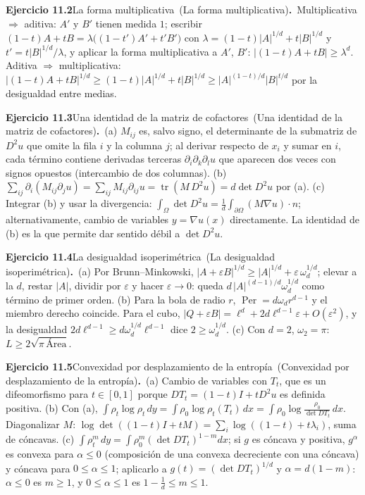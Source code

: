 \documentclass[11pt,a4paper]{amsart}
\newcommand{\ve}{\varepsilon}
\theoremstyle{remark}
\theoremstyle{definition}
\numberwithin{subsection}{section}
\numberwithin{equation}{section}
\newcommand{\ejlabel}[2]{\par\medskip\noindent\textbf{Ejercicio #1}\ifx\relax#2\relax\else\ (#2)\fi\textbf{.}\ }
\begin{document}
\ejlabel{11.2}{La forma multiplicativa}Multiplicativa $\Rightarrow$ aditiva: $A'$ y $B'$ tienen medida $1$; escribir $(1-t)A+tB=\lambda\bigl((1-t')A'+t'B'\bigr)$ con $\lambda=(1-t)|A|^{1/d}+t|B|^{1/d}$ y $t'=t|B|^{1/d}/\lambda$, y aplicar la forma multiplicativa a $A'$, $B'$: $|(1-t)A+tB|\ge\lambda^d$. Aditiva $\Rightarrow$ multiplicativa: $|(1-t)A+tB|^{1/d}\ge(1-t)|A|^{1/d}+t|B|^{1/d}\ge|A|^{(1-t)/d}|B|^{t/d}$ por la desigualdad entre medias.

\ejlabel{11.3}{Una identidad de la matriz de cofactores}(a) $M_{ij}$ es, salvo signo, el determinante de la submatriz de $D^2u$ que omite la fila $i$ y la columna $j$; al derivar respecto de $x_i$ y sumar en $i$, cada término contiene derivadas terceras $\partial_i\partial_k\partial_lu$ que aparecen dos veces con signos opuestos (intercambio de dos columnas). (b) $\sum_{ij}\partial_i(M_{ij}\partial_ju)=\sum_{ij}M_{ij}\partial_{ij}u=\operatorname{tr}(M\,D^2u)=d\det D^2u$ por (a). (c) Integrar (b) y usar la divergencia: $\int_\Omega\det D^2u=\frac1d\int_{\partial\Omega}(M\nabla u)\cdot n$; alternativamente, cambio de variables $y=\nabla u(x)$ directamente. La identidad de (b) es la que permite dar sentido débil a $\det D^2u$.

\ejlabel{11.4}{La desigualdad isoperimétrica}(a) Por Brunn--Minkowski, $|A+\ve B|^{1/d}\ge|A|^{1/d}+\ve\,\omega_d^{1/d}$; elevar a la $d$, restar $|A|$, dividir por $\ve$ y hacer $\ve\to0$: queda $d\,|A|^{(d-1)/d}\omega_d^{1/d}$ como término de primer orden. (b) Para la bola de radio $r$, $\operatorname{Per}=d\omega_dr^{d-1}$ y el miembro derecho coincide. Para el cubo, $|Q+\ve B|=\ell^d+2d\ell^{d-1}\ve+O(\ve^2)$, y la desigualdad $2d\ell^{d-1}\ge d\omega_d^{1/d}\ell^{d-1}$ dice $2\ge\omega_d^{1/d}$. (c) Con $d=2$, $\omega_2=\pi$: $L\ge2\sqrt{\pi\,\text{Área}}$.

\ejlabel{11.5}{Convexidad por desplazamiento de la entropía}(a) Cambio de variables con $T_t$, que es un difeomorfismo para $t\in[0,1]$ porque $DT_t=(1-t)I+tD^2u$ es definida positiva. (b) Con (a), $\int\rho_t\log\rho_t\,dy=\int\rho_0\log\rho_t(T_t)\,dx=\int\rho_0\log\frac{\rho_0}{\det DT_t}\,dx$. Diagonalizar $M$: $\log\det((1-t)I+tM)=\sum_i\log((1-t)+t\lambda_i)$, suma de cóncavas. (c) $\int\rho_t^m\,dy=\int\rho_0^m(\det DT_t)^{1-m}dx$; si $g$ es cóncava y positiva, $g^\alpha$ es convexa para $\alpha\le0$ (composición de una convexa decreciente con una cóncava) y cóncava para $0\le\alpha\le1$; aplicarlo a $g(t)=(\det DT_t)^{1/d}$ y $\alpha=d(1-m)$: $\alpha\le0$ es $m\ge1$, y $0\le\alpha\le1$ es $1-\frac1d\le m\le1$.
\end{document}
